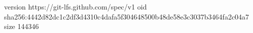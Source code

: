 version https://git-lfs.github.com/spec/v1
oid sha256:4442d82dc1c2df3d4310c4dafa5f304648500b48de58e3c3037b3464fa2c04a7
size 144346
